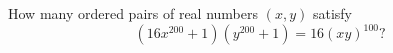 How many ordered pairs of real numbers $(x,y)$ satisfy
\[\left(16x^{200}+1\right)\left(y^{200}+1\right)=16(xy)^{100}?\]
